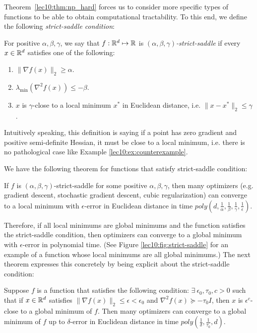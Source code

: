 Theorem~\ref{lec10:thm:np_hard} forces us to consider more specific types of functions to be able to obtain computational tractability. To this end, we define the following \textit{strict-saddle condition}:

\begin{definition} 
For positive $\alpha, \beta, \gamma$, we say that $f: \mathbb R^d \mapsto \mathbb R$ is \textit{$(\alpha, \beta, \gamma)$-strict-saddle} if every $x \in \mathbb R^d$ satisfies one of the following:
\begin{enumerate}
    \item $\|\nabla f(x)\|_2 \geq \alpha$.
    \item $\lambda_{\min}(\nabla^2 f(x)) \leq -\beta$.
    \item $x$ is $\gamma$-close to a local minimum $x^*$ in Euclidean distance, i.e. $\|x - x^*\|_2 \leq \gamma$.
\end{enumerate}
\end{definition}

Intuitively speaking, this definition is saying if a point has zero gradient and positive semi-definite Hessian, it must be close to a local minimum, i.e. there is no pathological case like Example \ref{lec10:ex:counterexample}.

We have the following theorem for functions that satisfy strict-saddle condition:

\begin{theorem} 
If $f$ is $(\alpha, \beta, \gamma)$-strict-saddle for some positive $\alpha, \beta, \gamma$, then many optimizers (e.g. gradient descent, stochastic gradient descent, cubic regularization) can converge to a local minimum with $\epsilon$-error in Euclidean distance in time $poly \left(d, \frac{1}{\alpha}, \frac{1}{\beta}, \frac{1}{\gamma}, \frac{1}{\epsilon}\right)$.
\end{theorem}

Therefore, if all local minimums are global minimums and the function satisfies the strict-saddle condition, then optimizers can converge to a global minimum with $\epsilon$-error in polynomial time. (See Figure \ref{lec10:fig:strict-saddle} for an example of a function whose local minimums are all global minimums.) The next theorem expresses this concretely by being explicit about the strict-saddle condition:

\begin{theorem}
Suppose $f$ is a function that satisfies the following condition: $\exists  \ \epsilon_0, \tau_0, c > 0$ such that if $x \in \mathbb R^d$ satisfies $\|\nabla f(x)\|_2 \leq \epsilon < \epsilon_0$ and $\nabla^2 f(x) \succeq -\tau_0I$, then $x$ is $\epsilon^c$-close to a global minimum of $f$. Then many optimizers can converge to a global minimum of $f$ up to $\delta$-error in Euclidean distance in time $poly\left(\frac{1}{\delta}, \frac{1}{\tau_0}, d \right)$.
\end{theorem}

